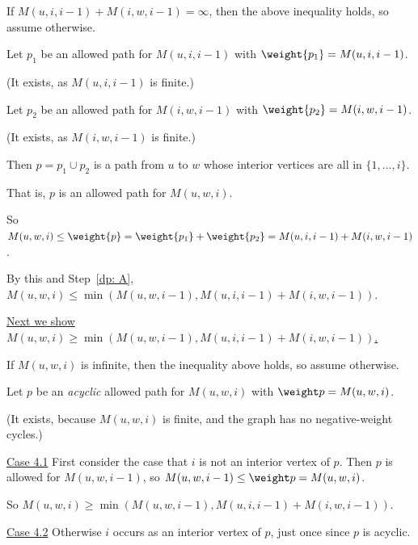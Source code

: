 \begin{longFormProof}
\begin{block}[dp: uwi]
\begin{block}[dp: main]
      \step If $M(u, i, i-1) + M(i, w, i-1) = \infty$, then the above inequality holds,
      so assume otherwise.

      \step Let $p_1$ be an allowed path for $M(u, i, i-1)$
      with $\weight {p_1} = M(u, i, i-1)$.

      (It exists, as $M(u, i, i-1)$ is finite.)

      \step Let $p_2$ be an allowed path for $M(i, w, i-1)$
      with $\weight {p_2} = M(i, w, i-1)$.

      (It exists, as $M(i, w, i-1)$ is finite.)

      \step Then $p=p_1 \cup p_2$ is a path from $u$ to $w$
      whose interior vertices are all in $\{1,\ldots, i\}$.

      \step That is, $p$ is an allowed path for $M(u, w, i)$.

      \step So $M(u, w, i) \le \weight {p} = \weight{p_1} + \weight{p_2}
      = M(u, i, i-1) + M(i, w, i-1)$.

      \step[dp: C] By this and Step~\ref{dp: A},
      $M(u, w, i) \le \min( M(u, w, i-1), M(u, i, i-1) + M(i, w, i-1) )$.

      \smallskip 

      \step \underline{Next we show
        $M(u, w, i) \ge \min( M(u, w, i-1), M(u, i, i-1) + M(i, w, i-1) )$.}

      \smallskip

      \step If $M(u, w, i)$ is infinite, then the inequality above holds,
      so assume otherwise.

      \step Let $p$ be an \emph{acyclic} allowed path for $M(u, w, i)$ with $\weight p = M(u, w, i)$.

      (It exists, because $M(u, w, i)$ is finite, and the graph has no negative-weight cycles.)

      \begin{block}[dp: not i]
        \step \underline{Case 4.1} First consider the case that $i$ is not an interior vertex of $p$.
        \step Then $p$ is allowed for $M(u, w, i-1)$,
        so $M(u, w, i-1) \le \weight p = M(u, w, i)$.

        \step So  $M(u, w, i) \ge \min( M(u, w, i-1), M(u, i, i-1) + M(i, w, i-1) )$. 
      \end{block}          

      \begin{block}[dp: i]
        \step \underline{Case 4.2} Otherwise $i$ occurs as an interior vertex of $p$,
        just once since $p$ is acyclic.
        

\end{block}
\end{block}
\end{block}
\end{longFormProof}
